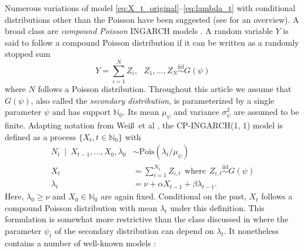 \documentclass{article}
\begin{document}
Numerous variations of model \eqref{eq:X_t_original}--\eqref{eq:lambda_t} with conditional distributions other than the Poisson have been suggested (see \cite{Weiss2018} for an overview). A broad class are \textit{compound Poisson} INGARCH models \cite{Goncalves2015, Silva2016}. A random variable $Y$ is said to follow a compound Poisson distribution \cite[Chapter 3]{Feller1968} if it can be written as a randomly stopped sum 
$$
Y = \sum_{i = 1}^N Z_i, \ \ \ Z_1, \dots, Z_N \stackrel{\text{iid}}{\sim} G(\psi)
$$
where $N$ follows a Poisson distribution. Throughout this article we assume that $G(\psi)$, also called the \textit{secondary distribution}, is parameterized by a single parameter $\psi$ and has support $\mathbb{N}_0$. Its mean $\mu_\psi$ and variance $\sigma^2_\psi$ are assumed to be finite. Adapting notation from Wei\ss\ et al \cite[Sec. 2]{Weiss2017}, the CP-INGARCH(1, 1) model is defined as a process $\{X_t, t \in \mathbb{N}_0\}$ with %
\begin{align}
N_t \ \mid \ X_{t - 1}, \dots, X_0, \lambda_0 & \sim \text{Pois}(\lambda_t/\mu_\psi) \label{eq:N_CP_original}\\
X_t & = \sum_{i = 1}^{N_t} Z_{i, t} \ \ \text{where} \ \  Z_{i, t} \stackrel{\text{iid}}{\sim} G(\psi)\label{eq:X_CP_original}\\
\lambda_t & = \nu + \alpha X_{t - 1} + \beta \lambda_{t - 1}.\label{eq:lambda_CP_original}
\end{align}
Here, $\lambda_0 \geq \nu$ and $X_0 \in \mathbb{N}_0$ are again fixed. Conditional on the past, $X_t$ follows a compound Poisson distribution with mean $\lambda_t$ under this definition. %
This formulation is somewhat more restrictive than the class discussed in \citep{Goncalves2015} where the parameter $\psi_t$ of the secondary distribution can depend on $\lambda_t$. It nonetheless contains a number of well-known models \cite[Observation 2]{Goncalves2015}:
\end{document}
